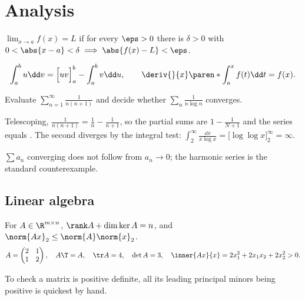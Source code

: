 \documentclass[10pt]{article}
\begin{document}
\section{Analysis}

\begin{definition}[Limit]
  $\lim_{x \to a} f(x) = L$ if for every $\eps > 0$ there is $\delta > 0$ with
  $0 < \abs{x - a} < \delta \implies \abs{f(x) - L} < \eps$.
\end{definition}

\begin{proposition}
  \[ \int_a^b u \dd v = \Big[uv\Big]_a^b - \int_a^b v \dd u,
     \qquad \deriv{}{x}\paren*{\int_a^x f(t) \dd t} = f(x). \]
\end{proposition}

\begin{problem}[Series]\label{prob:series}
  Evaluate $\displaystyle\sum_{n=1}^{\infty} \frac{1}{n(n+1)}$ and decide whether
  $\sum_n \frac{1}{n \log n}$ converges.
\end{problem}
\begin{solution}
  Telescoping, $\frac{1}{n(n+1)} = \frac1n - \frac1{n+1}$, so the partial sums are $1 - \frac1{N+1}$
  and the series equals . The second diverges by the integral test:
  $\int_2^\infty \frac{\dd x}{x \log x} = \big[\log\log x\big]_2^\infty = \infty$.
\end{solution}

\begin{warning}
  $\sum a_n$ converging does not follow from $a_n \to 0$; the harmonic series is the standard counterexample.
\end{warning}

\subsection{Linear algebra}
For $A \in \R^{m \times n}$, $\rank A + \dim\ker A = n$, and $\norm{Ax}_2 \le \norm{A}\norm{x}_2$.
\[
  A = \begin{pmatrix} 2 & 1 \\ 1 & 2 \end{pmatrix}, \quad
  A\T = A, \quad \tr A = 4, \quad \det A = 3, \quad
  \inner{Ax}{x} = 2x_1^2 + 2x_1x_2 + 2x_2^2 > 0 .
\]

\begin{tip}
  To check a matrix is positive definite, all its leading principal minors being positive is quickest by hand.
\end{tip}
\end{document}
